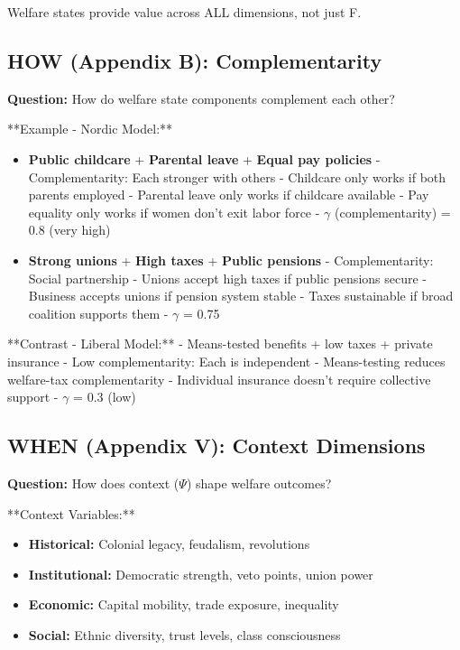 Welfare states provide value across ALL dimensions, not just F.

\subsection{HOW (Appendix B): Complementarity}

\textbf{Question:} How do welfare state components complement each other?

**Example - Nordic Model:**
\begin{itemize}
\item \textbf{Public childcare} + \textbf{Parental leave} + \textbf{Equal pay policies}
   - Complementarity: Each stronger with others
   - Childcare only works if both parents employed
   - Parental leave only works if childcare available
   - Pay equality only works if women don't exit labor force
   - $\gamma$ (complementarity) = 0.8 (very high)

\item \textbf{Strong unions} + \textbf{High taxes} + \textbf{Public pensions}
   - Complementarity: Social partnership
   - Unions accept high taxes if public pensions secure
   - Business accepts unions if pension system stable
   - Taxes sustainable if broad coalition supports them
   - $\gamma$ = 0.75
\end{itemize}

**Contrast - Liberal Model:**
- Means-tested benefits + low taxes + private insurance
- Low complementarity: Each is independent
- Means-testing reduces welfare-tax complementarity
- Individual insurance doesn't require collective support
- $\gamma$ = 0.3 (low)

\subsection{WHEN (Appendix V): Context Dimensions}

\textbf{Question:} How does context ($\Psi$) shape welfare outcomes?

**Context Variables:**
\begin{itemize}
\item \textbf{Historical:} Colonial legacy, feudalism, revolutions
\item \textbf{Institutional:} Democratic strength, veto points, union power
\item \textbf{Economic:} Capital mobility, trade exposure, inequality
\item \textbf{Social:} Ethnic diversity, trust levels, class consciousness
\end{itemize}

